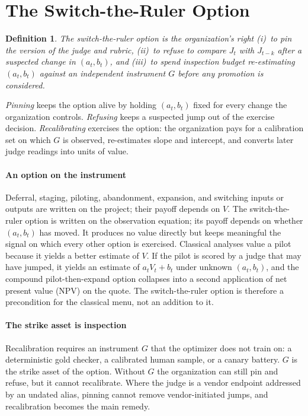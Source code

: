 \documentclass[acmsmall,screen,review]{acmart}
\theoremstyle{acmdefinition}
\newtheorem{construct}{Definition}
\begin{document}
\section{The Switch-the-Ruler Option}\label{sec:switch}

\begin{construct}
The \emph{switch-the-ruler option} is the organization's right (i)~to pin the version of the judge and rubric, (ii)~to refuse to compare $J_t$ with $J_{t-k}$ after a suspected change in $(a_t,b_t)$, and (iii)~to spend inspection budget re-estimating $(a_t,b_t)$ against an independent instrument $G$ before any promotion is considered.
\end{construct}

\emph{Pinning} keeps the option alive by holding $(a_t,b_t)$ fixed for every change the organization controls. \emph{Refusing} keeps a suspected jump out of the exercise decision. \emph{Recalibrating} exercises the option: the organization pays for a calibration set on which $G$ is observed, re-estimates slope and intercept, and converts later judge readings into units of value.

\paragraph{An option on the instrument} Deferral, staging, piloting, abandonment, expansion, and switching inputs or outputs are written on the project; their payoff depends on $V$. The switch-the-ruler option is written on the observation equation; its payoff depends on whether $(a_t,b_t)$ has moved. It produces no value directly but keeps meaningful the signal on which every other option is exercised. Classical analyses value a pilot because it yields a better estimate of $V$. If the pilot is scored by a judge that may have jumped, it yields an estimate of $a_tV_t + b_t$ under unknown $(a_t,b_t)$, and the compound pilot-then-expand option collapses into a second application of net present value (NPV) on the quote. The switch-the-ruler option is therefore a precondition for the classical menu, not an addition to it.

\paragraph{The strike asset is inspection} Recalibration requires an instrument $G$ that the optimizer does not train on: a deterministic gold checker, a calibrated human sample, or a canary battery. $G$ is the strike asset of the option. Without $G$ the organization can still pin and refuse, but it cannot recalibrate. Where the judge is a vendor endpoint addressed by an undated alias, pinning cannot remove vendor-initiated jumps, and recalibration becomes the main remedy.
\end{document}

